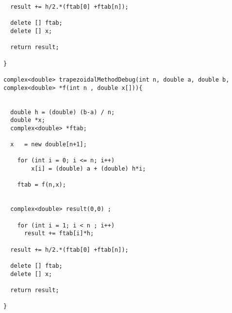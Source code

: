 \begin{lstlisting}
  result += h/2.*(ftab[0] +ftab[n]);

  delete [] ftab;
  delete [] x;

  return result;

}

complex<double> trapezoidalMethodDebug(int n, double a, double b, complex<double> *f(int n , double x[])){
  
      
  double h = (double) (b-a) / n;
  double *x;
  complex<double> *ftab;

  x   = new double[n+1]; 

    for (int i = 0; i <= n; i++)
        x[i] = (double) a + (double) h*i; 

    ftab = f(n,x); 


  complex<double> result(0,0) ;

    for (int i = 1; i < n ; i++)
      result += ftab[i]*h;
  
  result += h/2.*(ftab[0] +ftab[n]);

  delete [] ftab;
  delete [] x;

  return result;

}

\end{lstlisting}